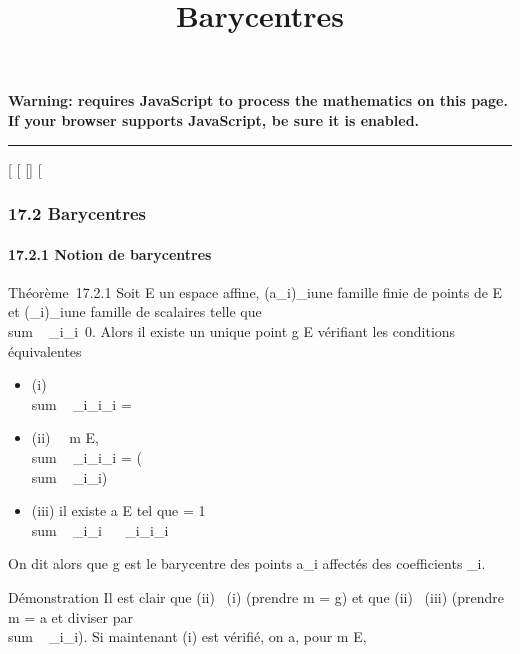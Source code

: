 \documentclass[]{article}
\title{Barycentres}
\author{}
\date{}
\begin{document}
\maketitle

\textbf{Warning: 
requires JavaScript to process the mathematics on this page.\\ If your
browser supports JavaScript, be sure it is enabled.}

\begin{center}\rule{3in}{0.4pt}\end{center}

{[}
{[}
{[}{]}
{[}

\subsubsection{17.2 Barycentres}

\paragraph{17.2.1 Notion de barycentres}

Théorème~17.2.1 Soit E un espace affine, (a_i)_i\inI une
famille finie de points de E et (\lambda_i)_i\inI une famille
de scalaires telle que
\\sum ~
_i\inI\lambda_i\neq~0. Alors il existe un
unique point g \in E vérifiant les conditions équivalentes

\begin{itemize}
\itemsep1pt\parskip0pt
\item
  (i) \\sum ~
  _i\inI\lambda_i\overrightarrowga_i
  =
\item
  (ii) \forall~~m \in E,
  \\sum ~
  _i\inI\lambda_i\overrightarrowma_i
  = (\\sum ~
  _i\inI\lambda_i)\overrightarrowmg
\item
  (iii) il existe a \in E tel que \overrightarrowag =
  1 \over
  \\sum ~
  _i\inI\lambda_i \
  \sum ~
  _i\inI\lambda_i\overrightarrowaa_i
\end{itemize}

On dit alors que g est le barycentre des points a_i affectés
des coefficients \lambda_i.

Démonstration Il est clair que (ii) \rigtharrow~(i) (prendre m = g) et que (ii)
\rigtharrow~(iii) (prendre m = a et diviser par
\\sum ~
_i\inI\lambda_i). Si maintenant (i) est vérifié, on a, pour m \in
E,
\end{document}
